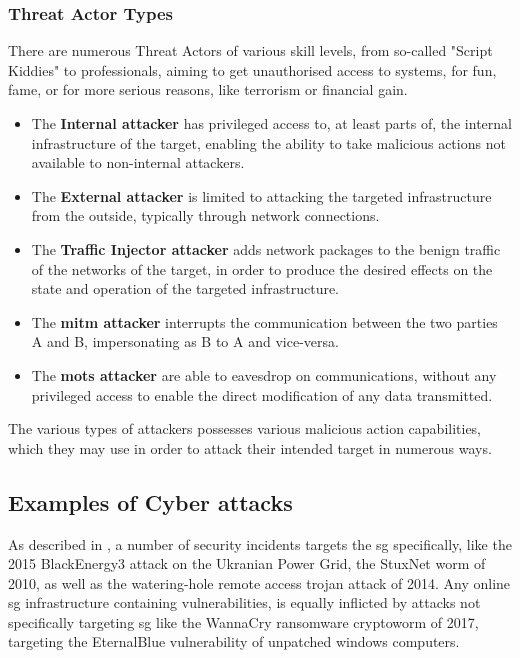 \subsubsection{Threat Actor  Types}
There are numerous Threat Actors of various skill levels, from so-called "Script Kiddies" to professionals, aiming to get unauthorised access to systems, for fun, fame, or for more serious reasons, like terrorism or financial gain. 

\begin{itemize}
    \item The \textbf{Internal attacker} has privileged access to, at least parts of, the internal infrastructure of the target, enabling the ability to take malicious actions not available to non-internal attackers.
    \item The \textbf{External attacker} is limited to attacking the targeted infrastructure from the outside, typically through network connections.
    \item The \textbf{Traffic Injector attacker} adds network packages to the benign traffic of the networks of the target, in order to produce the desired effects on the state and operation of the targeted infrastructure. 
    \item The \textbf{\acrshort{mitm} attacker} interrupts the communication between the two parties A and B, impersonating as B to A and vice-versa.
    \item The  \textbf{\acrshort{mots} attacker} are able to eavesdrop on communications, without any privileged access to enable the direct modification of any data transmitted.
\end{itemize}



The various types of attackers possesses various malicious action capabilities, which they may use in order to attack their intended target in numerous ways.












\subsection{Examples of Cyber attacks}
As described in \cite{sundararajan2019survey}, a number of security incidents targets the \acrshort{sg} specifically, like the 2015 BlackEnergy3 attack on the Ukranian  Power Grid, the StuxNet worm of 2010, as well as the watering-hole remote access trojan attack of 2014. 
Any online \acrshort{sg} infrastructure containing vulnerabilities, is equally inflicted by attacks not specifically targeting \acrfull{sg} like the WannaCry ransomware cryptoworm of 2017, targeting the EternalBlue vulnerability of unpatched windows computers.







